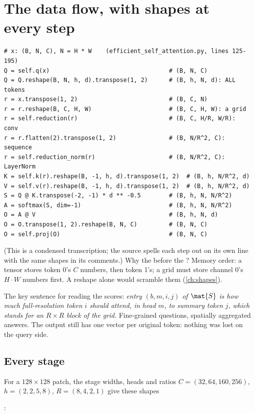 \section{The data flow, with shapes at every step}\label{sec:esa:flow}

\begin{lstlisting}
# x: (B, N, C), N = H * W    (efficient_self_attention.py, lines 125-195)
Q = self.q(x)                                  # (B, N, C)
Q = Q.reshape(B, N, h, d).transpose(1, 2)      # (B, h, N, d): ALL tokens
r = x.transpose(1, 2)                          # (B, C, N)
r = r.reshape(B, C, H, W)                      # (B, C, H, W): a grid
r = self.reduction(r)                          # (B, C, H/R, W/R): conv
r = r.flatten(2).transpose(1, 2)               # (B, N/R^2, C): sequence
r = self.reduction_norm(r)                     # (B, N/R^2, C): LayerNorm
K = self.k(r).reshape(B, -1, h, d).transpose(1, 2)  # (B, h, N/R^2, d)
V = self.v(r).reshape(B, -1, h, d).transpose(1, 2)  # (B, h, N/R^2, d)
S = Q @ K.transpose(-2, -1) * d ** -0.5        # (B, h, N, N/R^2)
A = softmax(S, dim=-1)                         # (B, h, N, N/R^2)
O = A @ V                                      # (B, h, N, d)
O = O.transpose(1, 2).reshape(B, N, C)         # (B, N, C)
O = self.proj(O)                               # (B, N, C)
\end{lstlisting}
(This is a condensed transcription; the source spells each step out on its own line with the same
shapes in its comments.) Why the  before the ? Memory order: a
 tensor stores token 0's $C$ numbers, then token 1's; a grid 
must store channel 0's $H\cdot W$ numbers first. A reshape alone would scramble them
(\cref{ch:shapes}).

The key sentence for reading the scores: \emph{entry $(b, m, i, j)$ of $\mat{S}$ is how much
full-resolution token $i$ should attend, in head $m$, to summary token $j$, which stands for an
$R\times R$ block of the grid.} Fine-grained questions, spatially aggregated answers. The output
still has one vector per original token: nothing was lost on the query side.

\subsection{Every stage}

For a $128\times128$ patch, the stage widths, heads and ratios
$C = (32, 64, 160, 256)$, $h = (2, 2, 5, 8)$, $R = (8, 4, 2, 1)$ give these shapes
\par\noindent{}:

